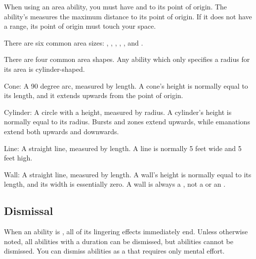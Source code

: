       When using an area ability, you must have  and  to its point of origin.
      The ability's  measures the maximum distance to its point of origin.
      If it does not have a range, its point of origin must touch your space.

      There are six common area sizes: \tinyarea, \smallarea, \medarea, \largearea, \hugearea, and \gargarea.

      There are four common area shapes.
      Any ability which only specifies a radius for its area is cylinder-shaped.
      \begin{raggeditemize}
        \item Cone: A 90 degree arc, measured by length. A cone's height is normally equal to its length, and it extends upwards from the point of origin.
        \item Cylinder: A circle with a height, measured by radius. A cylinder's height is normally equal to its radius. Bursts and zones extend upwards, while emanations extend both upwards and downwards.
        \item Line: A straight line, measured by length. A line is normally 5 feet wide and 5 feet high.
        \item Wall: A straight line, measured by length. A wall's height is normally equal to its length, and its width is essentially zero. A wall is always a , not a  or an .
      \end{raggeditemize}

  \subsection{Dismissal}\label{Dismissal}
    When an ability is , all of its lingering effects immediately end.
    Unless otherwise noted, all \magical abilities with a duration can be dismissed, but  abilities cannot be dismissed.
    You can dismiss abilities as a  that requires only mental effort.
